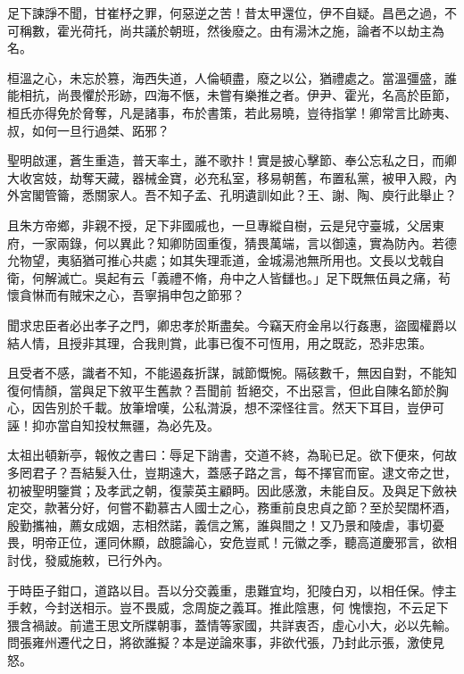 \begin{pinyinscope}
 足下諫諍不聞，甘崔杼之罪，何惡逆之苦！昔太甲還位，伊不自疑。昌邑之過，不可稱數，霍光荷托，尚共議於朝班，然後廢之。由有湯沐之施，論者不以劫主為名。



 桓溫之心，未忘於篡，海西失道，人倫頓盡，廢之以公，猶禮處之。當溫彊盛，誰能相抗，尚畏懼於形跡，四海不愜，未嘗有樂推之者。伊尹、霍光，名高於臣節，桓氏亦得免於脅奪，凡是諸事，布於書策，若此易曉，豈待指掌！卿常言比跡夷、叔，如何一旦行過桀、跖邪？



 聖明啟運，蒼生重造，普天率土，誰不歌抃！實是披心擊節、奉公忘私之日，而卿
 大收宮妓，劫奪天藏，器械金寶，必充私室，移易朝舊，布置私黨，被甲入殿，內外宮閣管籥，悉關家人。吾不知子孟、孔明遺訓如此？王、謝、陶、庾行此舉止？



 且朱方帝鄉，非親不授，足下非國戚也，一旦專縱自樹，云是兒守臺城，父居東府，一家兩錄，何以異此？知卿防固重復，猜畏萬端，言以御遠，實為防內。若德允物望，夷貊猶可推心共處；如其失理乖道，金城湯池無所用也。文長以戈戟自衛，何解滅亡。吳起有云「義禮不脩，舟中之人皆讎也。」足下既無伍員之痛，茍懷貪惏而有賊宋之心，吾寧捐申包之節邪？



 聞求忠臣者必出孝子之門，卿忠孝於斯盡矣。今竊天府金帛以行姦惠，盜國權爵以結人情，且授非其理，合我則賞，此事已復不可恆用，用之既訖，恐非忠策。



 且受者不感，識者不知，不能遏姦折謀，誠節慨惋。隔硋數千，無因自對，不能知復何情顏，當與足下敘平生舊款？吾聞前
 哲絕交，不出惡言，但此自陳名節於胸心，因告別於千載。放筆增嘆，公私潸淚，想不深怪往言。然天下耳目，豈伊可誣！抑亦當自知投杖無疆，為必先及。



 太祖出頓新亭，報攸之書曰：辱足下誚書，交道不終，為恥已足。欲下便來，何故多罔君子？吾結髮入仕，豈期遠大，蓋感子路之言，每不擇官而宦。逮文帝之世，初被聖明鑒賞；及孝武之朝，復蒙英主顧眄。因此感激，未能自反。及與足下斂袂定交，款著分好，何嘗不勸慕古人國士之心，務重前良忠貞之節？至於契闊杯酒，殷勤攜袖，薦女成姻，志相然諾，義信之篤，誰與間之！又乃景和陵虐，事切憂畏，明帝正位，運同休顯，啟臆論心，安危豈貳！元徽之季，聽高道慶邪言，欲相討伐，發威施敕，已行外內。



 于時臣子鉗口，道路以目。吾以分交義重，患難宜均，犯陵白刃，以相任保。悖主手敕，今封送相示。豈不畏威，念周旋之義耳。推此陰惠，何
 愧懷抱，不云足下猥含禍詖。前遣王思文所牒朝事，蓋情等家國，共詳衷否，虛心小大，必以先輸。問張雍州遷代之日，將欲誰擬？本是逆論來事，非欲代張，乃封此示張，激使見怒。




\end{pinyinscope}
